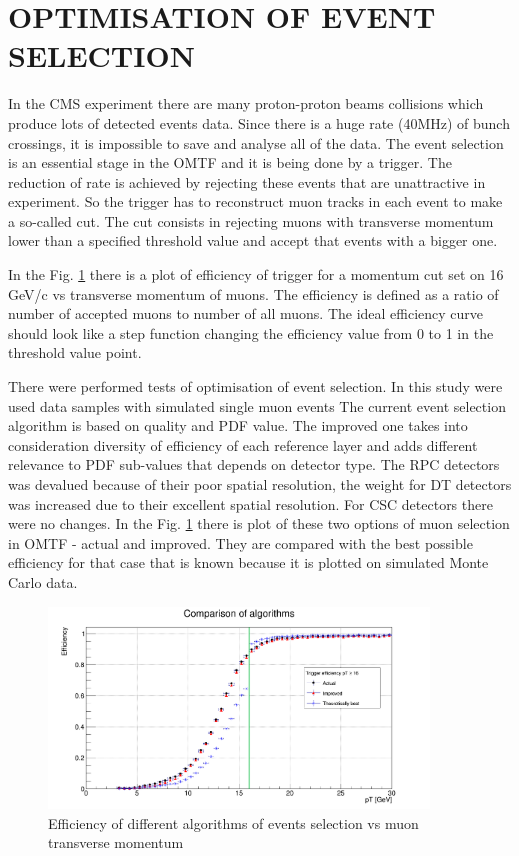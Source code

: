 \section{OPTIMISATION OF EVENT SELECTION}  

In the CMS experiment there are many proton-proton beams collisions which produce lots of detected events data.
Since there is a huge rate (40MHz) of bunch crossings, it is impossible to save and analyse all of the data.
The event selection is an essential stage in the OMTF and it is being done by a trigger.
The reduction of rate is achieved by rejecting these events that are unattractive in experiment.
So the trigger has to reconstruct muon tracks in each event to make a so-called cut.
The cut consists in rejecting muons with transverse momentum lower than a specified threshold value and accept that events with a bigger one.

In the Fig. \ref{eff} there is a plot of efficiency of trigger for a momentum cut set on 16 GeV/c vs transverse momentum of muons.
The efficiency is defined as a ratio of number of accepted muons to number of all muons.
The ideal efficiency curve should look like a step function changing the efficiency value from 0 to 1 in the threshold value point.

There were performed tests of optimisation of event selection.
In this study were used data samples with simulated single muon events
The current event selection algorithm is based on quality and PDF value.
The improved one takes into consideration diversity of efficiency of each reference layer and adds different relevance to PDF sub-values that depends on detector type.
The RPC detectors was devalued because of their poor spatial resolution, the weight for DT detectors was increased due to their excellent spatial resolution.
For CSC detectors there were no changes.
In the Fig. \ref{eff} there is plot of these two options of muon selection in OMTF - actual and improved.
They are compared with the best possible efficiency for that case that is known because it is plotted on simulated Monte Carlo data. %

\begin{figure}[ht]
\centering
\includegraphics[width=0.9\textwidth]{Hist16.png}
\caption{Efficiency of different algorithms of events selection vs muon transverse momentum}
\label{eff}
\end{figure} 

